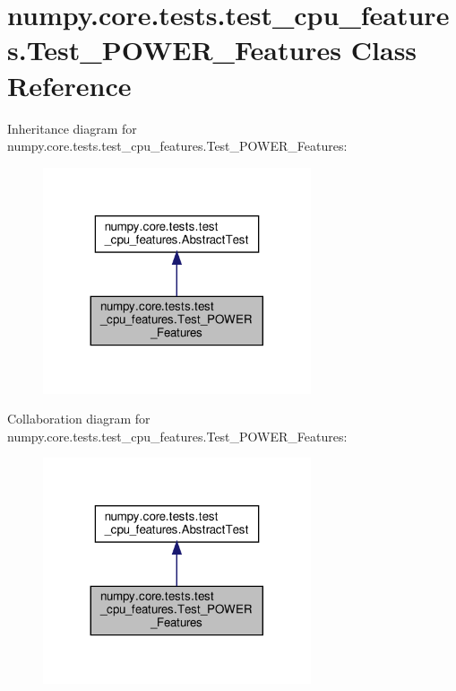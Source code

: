 \hypertarget{classnumpy_1_1core_1_1tests_1_1test__cpu__features_1_1Test__POWER__Features}{}\section{numpy.\+core.\+tests.\+test\+\_\+cpu\+\_\+features.\+Test\+\_\+\+P\+O\+W\+E\+R\+\_\+\+Features Class Reference}
\label{classnumpy_1_1core_1_1tests_1_1test__cpu__features_1_1Test__POWER__Features}


Inheritance diagram for numpy.\+core.\+tests.\+test\+\_\+cpu\+\_\+features.\+Test\+\_\+\+P\+O\+W\+E\+R\+\_\+\+Features\+:
\nopagebreak
\begin{figure}[H]
\begin{center}
\leavevmode
\includegraphics[width=224pt]{classnumpy_1_1core_1_1tests_1_1test__cpu__features_1_1Test__POWER__Features__inherit__graph}
\end{center}
\end{figure}


Collaboration diagram for numpy.\+core.\+tests.\+test\+\_\+cpu\+\_\+features.\+Test\+\_\+\+P\+O\+W\+E\+R\+\_\+\+Features\+:
\nopagebreak
\begin{figure}[H]
\begin{center}
\leavevmode
\includegraphics[width=224pt]{classnumpy_1_1core_1_1tests_1_1test__cpu__features_1_1Test__POWER__Features__coll__graph}
\end{center}
\end{figure}
